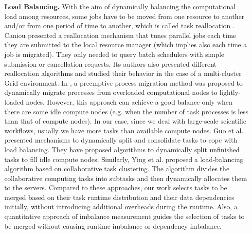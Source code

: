 \textbf{Load Balancing.} With the aim of dynamically balancing the computational load among resources, some jobs have to be moved from one resource to another and/or from one period of time to another, which is called task reallocation \cite{Tomas2012}. Caniou  \cite{Caniou2011} presented a reallocation mechanism that tunes parallel jobs each time they are submitted to the local resource manager (which implies also each time a job is migrated). They only needed to query batch schedulers with simple submission or cancellation requests.  Its authors also presented different reallocation algorithms and studied their behavior in the case of a multi-cluster Grid environment. In \cite{Zhang2000}, a preemptive process migration method was proposed to dynamically migrate processes from overloaded computational nodes to lightly-loaded nodes. However, this approach can achieve a good balance only when there are some idle compute nodes (e.g. when the number of task processes is less than that of compute nodes). In our case, since we deal with large-scale scientific workflows, usually we have more tasks than available compute nodes. 
Guo et al. \cite{Zhenhua2011} presented mechanisms to dynamically split and consolidate tasks to cope with load balancing. They have proposed algorithms to dynamically split unfinished tasks to fill idle compute nodes. Similarly, Ying et al. \cite{Ying2009} proposed a load-balancing algorithm based on collaborative task clustering. The algorithm divides the collaborative computing tasks into subtasks and then dynamically allocates them to the servers. Compared to these approaches, our work selects tasks to be merged based on their task runtime distribution and their data dependencies initially, without introducing additional overheads during the runtime. Also, a quantitative approach of imbalance measurement guides the selection of tasks to be merged without causing runtime imbalance or dependency imbalance. 



